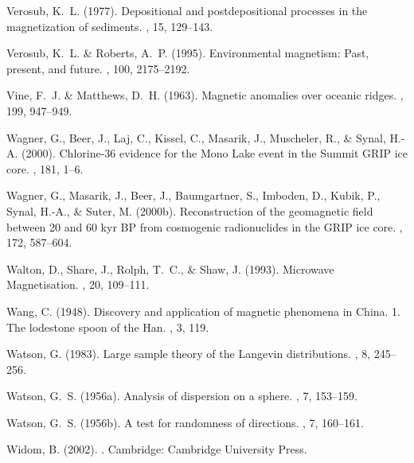 Verosub, K.~L. (1977).
\newblock Depositional and postdepositional processes in the magnetization of
  sediments.
, 15, 129--143.

Verosub, K.~L. \& Roberts, A.~P. (1995).
\newblock Environmental magnetism: Past, present, and future.
, 100, 2175--2192.

Vine, F.~J. \& Matthews, D.~H. (1963).
\newblock Magnetic anomalies over oceanic ridges.
, 199, 947--949.

Wagner, G., Beer, J., Laj, C., Kissel, C., Masarik, J., Muscheler, R., \&
  Synal, H.-A. (2000).
\newblock Chlorine-36 evidence for the Mono Lake event in the Summit GRIP ice
  core.
, 181, 1--6.

Wagner, G., Masarik, J., Beer, J., Baumgartner, S., Imboden, D., Kubik, P.,
  Synal, H.-A., \& Suter, M. (2000b).
\newblock Reconstruction of the geomagnetic field between 20 and 60 kyr BP from
  cosmogenic radionuclides in the GRIP ice core.
, 172, 587--604.

Walton, D., Share, J., Rolph, T.~C., \& Shaw, J. (1993).
\newblock Microwave Magnetisation.
, 20, 109--111.

Wang, C. (1948).
\newblock Discovery and application of magnetic phenomena in China. 1. The
  lodestone spoon of the Han.
, 3, 119.

Watson, G. (1983).
\newblock Large sample theory of the Langevin distributions.
, 8, 245--256.

Watson, G.~S. (1956a).
\newblock Analysis of dispersion on a sphere.
, 7, 153--159.

Watson, G.~S. (1956b).
\newblock A test for randomness of directions.
, 7, 160--161.

Widom, B. (2002).
.
\newblock Cambridge: Cambridge University Press.

